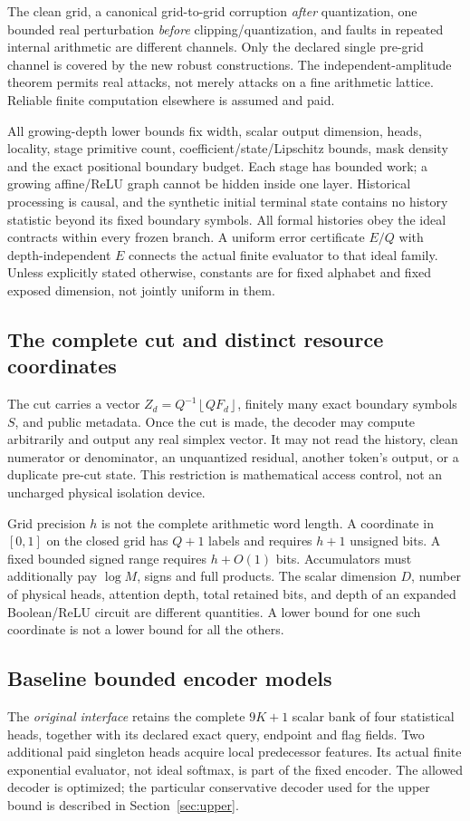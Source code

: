 \documentclass[11pt,letterpaper]{article}
\theoremstyle{definition}\newtheorem{definition}[theorem]{Definition}
\theoremstyle{remark}\newtheorem{remark}[theorem]{Remark}
\newcommand{\floor}[1]{\left\lfloor #1\right\rfloor}
\begin{document}
The clean grid, a canonical grid-to-grid corruption \emph{after} quantization, one bounded real perturbation \emph{before} clipping/quantization, and faults in repeated internal arithmetic are different channels. Only the declared single pre-grid channel is covered by the new robust constructions. The independent-amplitude theorem permits real attacks, not merely attacks on a fine arithmetic lattice. Reliable finite computation elsewhere is assumed and paid.

All growing-depth lower bounds fix width, scalar output dimension, heads, locality, stage primitive count, coefficient/state/Lipschitz bounds, mask density and the exact positional boundary budget. Each stage has bounded work; a growing affine/ReLU graph cannot be hidden inside one layer. Historical processing is causal, and the synthetic initial terminal state contains no history statistic beyond its fixed boundary symbols. All formal histories obey the ideal contracts within every frozen branch. A uniform error certificate $E/Q$ with depth-independent $E$ connects the actual finite evaluator to that ideal family. Unless explicitly stated otherwise, constants are for fixed alphabet and fixed exposed dimension, not jointly uniform in them.

\subsection{The complete cut and distinct resource coordinates}
The cut carries a vector $Z_d=Q^{-1}\floor{QF_d}$, finitely many exact boundary symbols $S$, and public metadata. Once the cut is made, the decoder may compute arbitrarily and output any real simplex vector. It may not read the history, clean numerator or denominator, an unquantized residual, another token's output, or a duplicate pre-cut state. This restriction is mathematical access control, not an uncharged physical isolation device.

Grid precision $h$ is not the complete arithmetic word length. A coordinate in $[0,1]$ on the closed grid has $Q+1$ labels and requires $h+1$ unsigned bits. A fixed bounded signed range requires $h+O(1)$ bits. Accumulators must additionally pay $\log M$, signs and full products. The scalar dimension $D$, number of physical heads, attention depth, total retained bits, and depth of an expanded Boolean/ReLU circuit are different quantities. A lower bound for one such coordinate is not a lower bound for all the others.

\subsection{Baseline bounded encoder models}
The \emph{original interface} retains the complete $9K+1$ scalar bank of four statistical heads, together with its declared exact query, endpoint and flag fields. Two additional paid singleton heads acquire local predecessor features. Its actual finite exponential evaluator, not ideal softmax, is part of the fixed encoder. The allowed decoder is optimized; the particular conservative decoder used for the upper bound is described in Section~\ref{sec:upper}.
\end{document}
